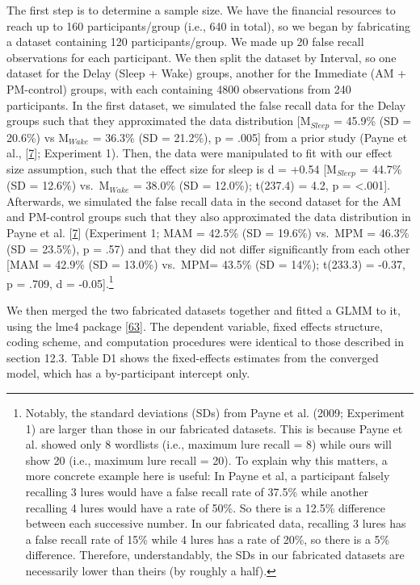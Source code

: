 \documentclass[
]{article}
\begin{document}
The first step is to determine a sample size. We have the financial resources to reach up to 160 participants/group (i.e., 640 in total), so we began by fabricating a dataset containing 120 participants/group. We made up 20 false recall observations for each participant. We then split the dataset by Interval, so one dataset for the Delay (Sleep + Wake) groups, another for the Immediate (AM + PM-control) groups, with each containing 4800 observations from 240 participants. In the first dataset, we simulated the false recall data for the Delay groups such that they approximated the data distribution {[}M\(_{Sleep}\) = 45.9\% (SD = 20.6\%) vs M\(_{Wake}\) = 36.3\% (SD = 21.2\%), p = .005{]} from a prior study (Payne et al., {[}\protect\hyperlink{ref-payne2009a}{7}{]}; Experiment 1). Then, the data were manipulated to fit with our effect size assumption, such that the effect size for sleep is d = +0.54 {[}M\(_{Sleep}\) = 44.7\% (SD = 12.6\%) vs.~M\(_{Wake}\) = 38.0\% (SD = 12.0\%); t(237.4) = 4.2, p = \textless.001{]}. Afterwards, we simulated the false recall data in the second dataset for the AM and PM-control groups such that they also approximated the data distribution in Payne et al. {[}\protect\hyperlink{ref-payne2009a}{7}{]} (Experiment 1; MAM = 42.5\% (SD = 19.6\%) vs.~MPM = 46.3\% (SD = 23.5\%), p = .57) and that they did not differ significantly from each other {[}MAM = 42.9\% (SD = 13.0\%) vs.~MPM= 43.5\% (SD = 14\%); t(233.3) = -0.37, p = .709, d = -0.05{]}.\footnote{Notably, the standard deviations (SDs) from Payne et al. (2009; Experiment 1) are larger than those in our fabricated datasets. This is because Payne et al. showed only 8 wordlists (i.e., maximum lure recall = 8) while ours will show 20 (i.e., maximum lure recall = 20). To explain why this matters, a more concrete example here is useful: In Payne et al, a participant falsely recalling 3 lures would have a false recall rate of 37.5\% while another recalling 4 lures would have a rate of 50\%. So there is a 12.5\% difference between each successive number. In our fabricated data, recalling 3 lures has a false recall rate of 15\% while 4 lures has a rate of 20\%, so there is a 5\% difference. Therefore, understandably, the SDs in our fabricated datasets are necessarily lower than theirs (by roughly a half).}

We then merged the two fabricated datasets together and fitted a GLMM to it, using the lme4 package {[}\protect\hyperlink{ref-bates2015a}{63}{]}. The dependent variable, fixed effects structure, coding scheme, and computation procedures were identical to those described in section 12.3. Table D1 shows the fixed-effects estimates from the converged model, which has a by-participant intercept only.
\end{document}
